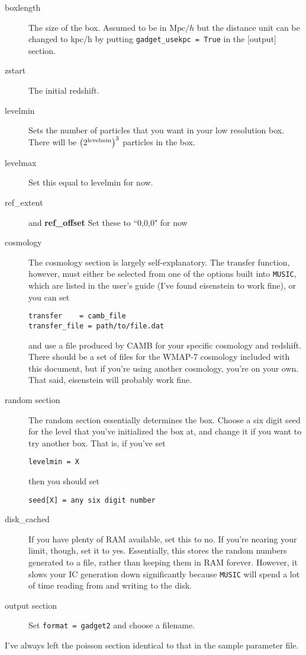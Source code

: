 \documentclass[10pt,a4paper,onecolumn]{article}
\newcommand{\hmpc}{\mathrm{Mpc}/h}
\begin{document}
\begin{description}
\item[boxlength]  The size of the box.  Assumed to be in $\hmpc$ but the distance
unit can be changed to kpc/h by putting \texttt{gadget\_usekpc = True} in the 
[output] section.
\item[zstart] The initial redshift.
\item[levelmin] Sets the number of particles that you want in your low resolution
box.  There will be $\left(2^{\rm levelmin}\right)^3$ particles in the box.
\item[levelmax] Set this equal to levelmin for now.
\item[ref\_extent] and \textbf{ref\_offset} Set these to ``0,0,0" for now
\item[cosmology] The cosmology section is largely self-explanatory.  The 
transfer function, however, must either be selected from one of the options built
into \texttt{MUSIC}, which are listed in the user's guide (I've found eisenstein to work fine),
or you can set 
\begin{verbatim}
transfer	= camb_file  
transfer_file = path/to/file.dat
\end{verbatim}
and use a file produced by CAMB for your specific cosmology and redshift.  
There should be a set of files for the WMAP-7 cosmology included with 
this document, but if you're using another cosmology, you're on your own.  
That said, eisenstein will probably work fine.  
\item[random section] The random section essentially determines the box.  
Choose  a six digit seed for the level that you've initialized the box at, and change
it if you want to try another box.  That is, if you've set
\begin{verbatim}
levelmin = X
\end{verbatim}
then you should set
\begin{verbatim}
seed[X] = any six digit number
\end{verbatim}
\item[disk\_cached] If you have plenty of RAM available, set this to no.  If 
you're nearing your limit, though, set it to yes.  Essentially, this stores the random 
numbers generated to a file, rather than keeping them in RAM forever.  However, 
it slows your IC generation down significantly because \texttt{MUSIC} will spend
a lot of time reading from and writing to the disk.
\item[output section] Set \texttt{format = gadget2} and choose a filename.
\end{description}
I've always left the poisson section identical to that in the sample parameter file.
\end{document}
